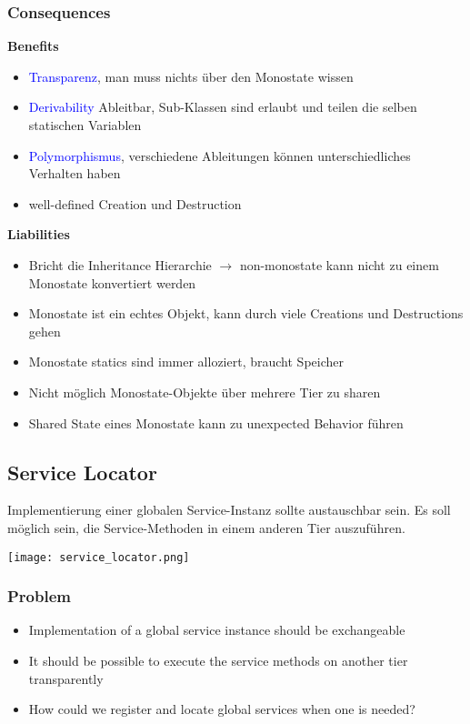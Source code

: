 \subsubsection{Consequences}
\textbf{Benefits}
\begin{itemize}
    \item \textcolor{blue}{Transparenz}, man muss nichts über den Monostate wissen
    \item \textcolor{blue}{Derivability} Ableitbar, Sub-Klassen sind erlaubt und teilen die selben statischen Variablen
    \item \textcolor{blue}{Polymorphismus}, verschiedene Ableitungen können unterschiedliches Verhalten haben
    \item well-defined Creation und Destruction
\end{itemize}
\vspace{10pt}
\textbf{Liabilities}
\begin{itemize}
    \item Bricht die Inheritance Hierarchie $\rightarrow$ non-monostate kann nicht zu einem Monostate konvertiert werden
    \item Monostate ist ein echtes Objekt, kann durch viele Creations und Destructions gehen
    \item Monostate statics sind immer alloziert, braucht Speicher
    \item Nicht möglich Monostate-Objekte über mehrere Tier zu sharen
    \item Shared State eines Monostate kann zu unexpected Behavior führen
\end{itemize}

\vfill\null
\columnbreak

\subsection{Service Locator}

Implementierung einer globalen Service-Instanz sollte austauschbar sein. Es soll möglich sein, die Service-Methoden in einem anderen Tier auszuführen.

\texttt{[image: service\_locator.png]}

\subsubsection{Problem}
\begin{itemize}
    \item Implementation of a global service instance should be exchangeable
    \item It should be possible to execute the service methods on another tier transparently
    \item How could we register and locate global services when one is needed?
\end{itemize}


